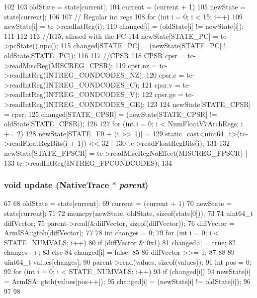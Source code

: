 \begin{DoxyCode}
102 {
103     oldState = state[current];
104     current = (current + 1) %
105     newState = state[current];
106 
107     // Regular int regs
108     for (int i = 0; i < 15; i++) {
109         newState[i] = tc->readIntReg(i);
110         changed[i] = (oldState[i] != newState[i]);
111     }
112 
113     //R15, aliased with the PC
114     newState[STATE_PC] = tc->pcState().npc();
115     changed[STATE_PC] = (newState[STATE_PC] != oldState[STATE_PC]);
116 
117     //CPSR
118     CPSR cpsr = tc->readMiscReg(MISCREG_CPSR);
119     cpsr.nz = tc->readIntReg(INTREG_CONDCODES_NZ);
120     cpsr.c = tc->readIntReg(INTREG_CONDCODES_C);
121     cpsr.v = tc->readIntReg(INTREG_CONDCODES_V);
122     cpsr.ge = tc->readIntReg(INTREG_CONDCODES_GE);
123 
124     newState[STATE_CPSR] = cpsr;
125     changed[STATE_CPSR] = (newState[STATE_CPSR] != oldState[STATE_CPSR]);
126 
127     for (int i = 0; i < NumFloatV7ArchRegs; i += 2) {
128         newState[STATE_F0 + (i >> 1)] =
129             static_cast<uint64_t>(tc->readFloatRegBits(i + 1)) << 32 |
130             tc->readFloatRegBits(i);
131     }
132     newState[STATE_FPSCR] = tc->readMiscRegNoEffect(MISCREG_FPSCR) |
133                             tc->readIntReg(INTREG_FPCONDCODES);
134 }
\end{DoxyCode}
\hypertarget{structTrace_1_1ArmNativeTrace_1_1ThreadState_a85ec503b4f5d7eeddd8cda17abf92e24}{
\subsubsection[{update}]{\setlength{\rightskip}{0pt plus 5cm}void update ({\bf NativeTrace} $\ast$ {\em parent})}}
\label{structTrace_1_1ArmNativeTrace_1_1ThreadState_a85ec503b4f5d7eeddd8cda17abf92e24}



\begin{DoxyCode}
67 {
68     oldState = state[current];
69     current = (current + 1) %
70     newState = state[current];
71 
72     memcpy(newState, oldState, sizeof(state[0]));
73 
74     uint64_t diffVector;
75     parent->read(&diffVector, sizeof(diffVector));
76     diffVector = ArmISA::gtoh(diffVector);
77 
78     int changes = 0;
79     for (int i = 0; i < STATE_NUMVALS; i++) {
80         if (diffVector & 0x1) {
81             changed[i] = true;
82             changes++;
83         } else {
84             changed[i] = false;
85         }
86         diffVector >>= 1;
87     }
88 
89     uint64_t values[changes];
90     parent->read(values, sizeof(values));
91     int pos = 0;
92     for (int i = 0; i < STATE_NUMVALS; i++) {
93         if (changed[i]) {
94             newState[i] = ArmISA::gtoh(values[pos++]);
95             changed[i] = (newState[i] != oldState[i]);
96         }
97     }
98 }
\end{DoxyCode}


